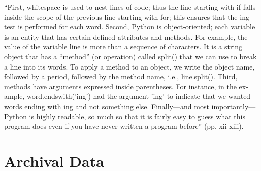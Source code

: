 \documentclass[12pt]{article}
\begin{document}
\begin{enumerate}
``First, whitespace is used to nest lines of code; thus the line starting with if falls inside the scope of the previous line starting with for; this ensures that the ing test is performed for each word. Second, Python is object-oriented; each variable is an entity that has certain defined attributes and methods. For example, the value of the variable line is more than a sequence of characters. It is a string object that has a “method” (or operation) called split() that we can use to break a line into its words. To apply a method to an object, we write the object name, followed by a period, followed by the method name, i.e., line.split(). Third, methods have arguments expressed inside parentheses. For instance, in the ex- ample, word.endswith('ing') had the argument 'ing' to indicate that we wanted words ending with ing and not something else. Finally—and most importantly—Python is highly readable, so much so that it is fairly easy to guess what this program does even if you have never written a program before'' (pp. xii-xiii).


\end{enumerate}
\section{Archival Data}
\end{document}
